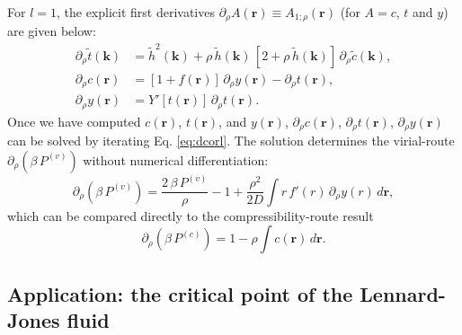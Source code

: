 \documentclass[aip,jcp,preprint,superscriptaddress,showpacs,preprintnumbers,amsmath,amssymb]{revtex4-1}
\numberwithin{equation}{section}
\newcommand{\vct}[1]{\mathbf{#1}}
\providecommand{\vr}{} %
\renewcommand{\vr}{\vct{r}}
\newcommand{\vk}{\vct{k}}
\begin{document}
For $l = 1$,
the explicit first derivatives
$\partial_\rho A(\vr) \equiv A_{1;\rho}(\vr)$
(for $A = c$, $t$ and $y$)
are given below:
%
%
%
\begin{equation}
\begin{split}
\partial_\rho \tilde t(\vk)
&=
\tilde h^2(\vk)
+
\rho \, \tilde h(\vk) \,
[2 + \rho \, \tilde h(\vk)] \, \partial_\rho \tilde c(\vk),
\\
%
\partial_\rho c(\vr)
&=
[1 + f(\vr)] \, \partial_\rho y(\vr)
- \partial_\rho t(\vr),
\\
\partial_\rho y(\vr)
&=
Y'[t(\vr)] \, \partial_\rho t(\vr).
\end{split}
\label{eq:dcorl}
\end{equation}
%
%
%
Once we have computed
$c(\vr)$, $t(\vr)$, and $y(\vr)$,
$\partial_\rho c(\vr)$,
$\partial_\rho t(\vr)$,
$\partial_\rho y(\vr)$
can be solved by iterating Eq. \eqref{eq:dcorl}.
%
The solution determines the virial-route
$\partial_\rho \left( \beta \, P^{(v)} \right)$
without numerical differentiation:
%
%
%
\[
\partial_\rho (\beta \, P^{(v)})
=
\frac{ 2 \, \beta \, P^{(v)} } { \rho } - 1
+ \frac{ \rho^2 } { 2 D }
  \int r \, f'(r) \, \partial_\rho y(r) \, d\vr,
\]
%
%
%
which can be compared directly to
the compressibility-route result
%
\[
\partial_\rho \left( \beta \, P^{(c)} \right)
=
1 - \rho \int c(\vr) \, d\vr.
\]






\subsection{Application: the critical point of the Lennard-Jones fluid}
\end{document}
